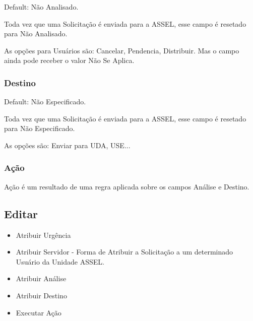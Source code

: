 			Default: Não Analisado.			
			
			Toda vez que uma Solicitação é enviada para a ASSEL, esse campo é resetado para Não Analisado.
			
			As opções para Usuários são: Cancelar, Pendencia, Distribuir. Mas o campo ainda pode receber o valor Não Se Aplica.
			
		\subsubsection{Destino}			
		
			Default: Não Especificado.
				
			Toda vez que uma Solicitação é enviada para a ASSEL, esse campo é resetado para Não Especificado.
			
			As opções são: Enviar para UDA, USE...
			
			
		\subsubsection{Ação}			
		
			Ação é um resultado de uma regra aplicada sobre os campos Análise e Destino.
			
		
		
		

		
	
	\subsection{Editar}

	\begin{itemize}
		\item Atribuir Urgência
		\item Atribuir Servidor  - Forma de Atribuir a Solicitação a um determinado Usuário da Unidade ASSEL.
		\item Atribuir Análise
		\item Atribuir Destino
		\item Executar Ação
	\end{itemize}	


	
